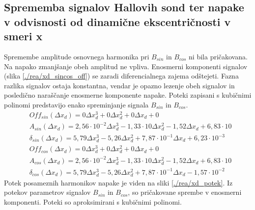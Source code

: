 \subsection{Sprememba signalov Hallovih sond ter napake v odvisnosti od dinamične ekscentričnosti v smeri x}
Spremembe amplitude osnovnega harmonika pri $B_{sin}$ in $B_{cos}$ ni bila pričakovana. Na napako zmanjšanje obeh amplitud ne vpliva. Enosmerni komponenti signalov (slika \ref{./rea/xd_sincos_off}) se zaradi diferencialnega zajema odštejeti. Fazna razlika signalov ostaja konstantna, vendar je opazno lezenje obeh signalov in posledično naraščanje enosmerne komponente napake.
Poteki zapisani s kubičnimi polinomi predstavijo enako spreminjanje signala $B_{sin}$ in $B_{cos}$.
\begin{eqnarray}
&Off_{sin}(\Delta x_d) =0\Delta x_d^{3}+0\Delta x_d^{2}+0\Delta x_d+0 \\
&A_{sin}(\Delta x_d) =2,56\cdot 10^{-2}\Delta x_d^{3}-1,33\cdot 10\Delta x_d^{2}-1,52\Delta x_d+6,83\cdot 10 \\                          
&\delta_{sin}(\Delta x_d) =5,79\Delta x_d^{3}-5,26\Delta x_d^{2}+7,87\cdot 10^{-1}\Delta x_d+6,23\cdot 10^{-3} \\                               
&Off_{cos}(\Delta x_d) =0\Delta x_d^{3}+0\Delta x_d^{2}+0\Delta x_d+0 \\
&A_{cos}(\Delta x_d) =2,56\cdot 10^{-2}\Delta x_d^{3}-1,33\cdot 10\Delta x_d^{2}-1,52\Delta x_d+6,83\cdot 10 \\                          
&\delta_{cos}(\Delta x_d) =5,79\Delta x_d^{3}-5,26\Delta x_d^{2}+7,87\cdot 10^{-1}\Delta x_d-1,57\cdot 10^{-2}
\end{eqnarray}
Potek posameznih harmonikov napake je viden na sliki \ref{./rea/xd_potek}. Iz potekov parametrov signalov $B_{sin}$ in $B_{cos}$, so pričakovane sprembe v enosmerni komponenti.  Poteki so aproksimirani s kubičnimi polinomi.
